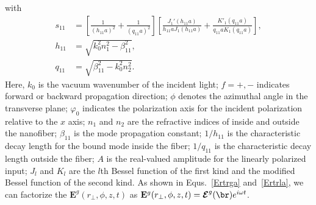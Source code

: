 \documentclass[]{report}
\begin{document}
with
\begin{subequations}
\begin{align}
s_{11} &= \left[\frac{1}{(h_{11}a)^2}+ \frac{1}{(q_{11}a)^2} \right] \left[ \frac{J_1'(h_{11}a)}{h_{11}aJ_1(h_{11}a)} + \frac{K'_1(q_{11}a)}{q_{11}aK_1(q_{11}a)} \right],\\
h_{11} &= \sqrt{k_0^2 n_1^2-\beta_{11}^2},\\
q_{11} &= \sqrt{\beta^2_{11}-k_0^2 n_2^2}.
\end{align}
\end{subequations}
Here, $ k_0 $ is the vacuum wavenumber of the incident light; $ f=+,- $ indicates forward or backward propagation direction; $ \phi $ denotes the azimuthal angle in the transverse plane; $ \varphi_0 $ indicates the polarization axis for the incident polarization relative to the $ x  $ axis; $ n_1 $ and $ n_2 $ are the refractive indices of inside and outside the nanofiber; $ \beta_{11} $ is the mode propagation constant; $ 1/h_{11} $ is the characteristic decay length for the bound mode inside the fiber; $ 1/q_{11} $ is the characteristic decay length outside the fiber; $ A $ is the real-valued amplitude for the linearly polarized input; $ J_l $ and $ K_l  $ are the $ l $th Bessel function of the first kind and the modified Bessel function of the second kind. As shown in Equs.~\ref{Ertrga} and~\ref{Ertrla}, we can factorize the $ \mathbf{E}^g(r_\perp,\phi,z,t) $ as $ \mathbf{E}^g(r_\perp,\phi,z,t)= \boldsymbol{\mathcal{E}}^g(\br)e^{i\omega t} $. 
\end{document}
